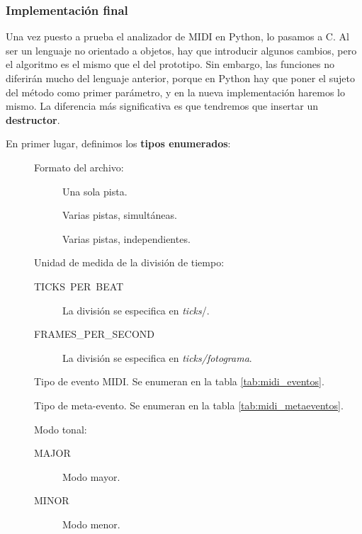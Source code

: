 \smallskip

\subsubsection{Implementación final}

Una vez puesto a prueba el analizador de \acrshort{MIDI} en Python, lo pasamos a C. Al ser un lenguaje no orientado a objetos, hay que introducir algunos cambios, pero el algoritmo es el mismo que el del prototipo. Sin embargo, las funciones no diferirán mucho del lenguaje anterior, porque en Python hay que poner el sujeto del método como primer parámetro, y en la nueva implementación haremos lo mismo. La diferencia más significativa es que tendremos que insertar un \textbf{destructor}.

En primer lugar, definimos los \textbf{tipos enumerados}:

\begin{description}
	\item[] Formato del archivo:
	
	\begin{description}
		\item[] Una sola pista.
		\item[] Varias pistas, simultáneas.
		\item[] Varias pistas, independientes.
	\end{description}
	
	\item[] Unidad de medida de la división de tiempo:
	
	\begin{description}
		\item[TICKS\ PER\ BEAT] La división se especifica en \textit{ticks}/\quarternote.
		\item[FRAMES\_PER\_SECOND] La división se especifica en \textit{ticks/fotograma}.
	\end{description}
	
	\item[] Tipo de evento \acrshort{MIDI}. Se enumeran en la tabla \ref{tab:midi_eventos}.
	\item[] Tipo de meta-evento. Se enumeran en la tabla \ref{tab:midi_metaeventos}.
	
	\item[] Modo tonal:
	
	\begin{description}
		\item[MAJOR] Modo mayor.
		\item[MINOR] Modo menor.
	\end{description}
\end{description}

